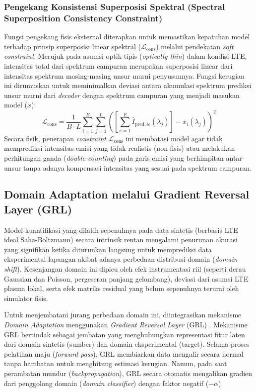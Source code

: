 \subsubsection{Pengekang Konsistensi Superposisi Spektral (Spectral Superposition Consistency Constraint)}

Fungsi pengekang fisis eksternal diterapkan untuk memastikan kepatuhan model terhadap prinsip superposisi linear spektral ($\mathcal{L}_{\mathrm{cons}}$) melalui pendekatan \textit{soft constraint}. Merujuk pada asumsi optik tipis (\textit{optically thin}) dalam kondisi LTE, intensitas total dari spektrum campuran merupakan superposisi linear dari intensitas spektrum masing-masing unsur murni penyusunnya. Fungsi kerugian ini dirumuskan untuk meminimalkan deviasi antara akumulasi spektrum prediksi unsur murni dari \textit{decoder} dengan spektrum campuran yang menjadi masukan model ($x$):
\begin{equation}
\mathcal{L}_{\mathrm{cons}} = \frac{1}{B \cdot L} \sum_{i=1}^{B} \sum_{j=1}^{L} \left( \left[ \sum_{e=1}^{E} \hat{I}_{\mathrm{pred}, ie}(\lambda_j) \right] - x_i(\lambda_j) \right)^2
\end{equation}
Secara fisik, penerapan \textit{constraint} $\mathcal{L}_{\mathrm{cons}}$ ini membatasi model agar tidak memprediksi intensitas emisi yang tidak realistis (non-fisis) atau melakukan perhitungan ganda (\textit{double-counting}) pada garis emisi yang berhimpitan antar-unsur tanpa adanya kompensasi intensitas yang sesuai pada spektrum campuran.

\subsection{Domain Adaptation melalui Gradient Reversal Layer (GRL)} \label{subsec:bab2_domain_adaptation}

Model kuantifikasi yang dilatih sepenuhnya pada data sintetis (berbasis LTE ideal Saha-Boltzmann) secara intrinsik rentan mengalami penurunan akurasi yang signifikan ketika diturunkan langsung untuk memprediksi data eksperimental lapangan akibat adanya perbedaan distribusi domain (\textit{domain shift}). Kesenjangan domain ini dipicu oleh efek instrumentasi riil (seperti derau Gaussian dan Poisson, pergeseran panjang gelombang), deviasi dari asumsi LTE plasma lokal, serta efek matriks residual yang belum sepenuhnya terurai oleh simulator fisis.

Untuk menjembatani jurang perbedaan domain ini, diintegrasikan mekanisme \textit{Domain Adaptation} menggunakan \textit{Gradient Reversal Layer} (GRL) \citep{ganin_unsupervised_2015, ganin_domain_2016}. Mekanisme GRL bertindak sebagai jembatan yang menghubungkan representasi fitur laten dari domain sintetis (sumber) dan domain eksperimental (target). Selama proses pelatihan maju (\textit{forward pass}), GRL membiarkan data mengalir secara normal tanpa hambatan untuk menghitung estimasi kerugian. Namun, pada saat perambatan mundur (\textit{backpropagation}), GRL secara otomatis mengalikan gradien dari penggolong domain (\textit{domain classifier}) dengan faktor negatif ($-\alpha$).

